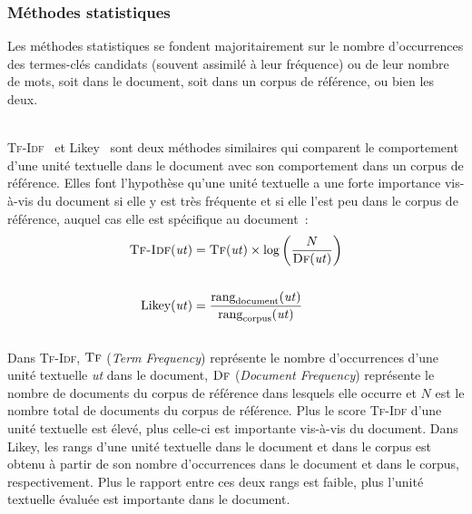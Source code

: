       \subsubsection{Méthodes statistiques}
      \label{subsubsec:main-state_of_the_art-automatic_keyphrase_extraction-unsupervised_keyphrase_extraction-statistical_approaches}
        Les méthodes statistiques se fondent majoritairement sur le nombre d'occurrences des termes-clés candidats (souvent assimilé à leur
        fréquence) ou de leur nombre de mots, soit dans le
        document, soit dans un corpus de référence, ou bien les deux.

        ~\\\textsc{Tf-Idf}~\cite{jones1972tfidf} et Likey~\cite{paukkeri2010likey}
        sont deux méthodes similaires qui comparent le comportement d'une unité
        textuelle dans le document avec son comportement dans un corpus de
        référence. Elles font l'hypothèse qu'une unité textuelle a une forte
        importance vis-à-vis du document si elle y est très fréquente et si elle
        l'est peu dans le corpus de référence, auquel cas elle est spécifique au
        document~:
        \begin{align}
          \text{\textsc{Tf-Idf}}(\text{\textit{ut}}) &= \textsc{Tf}(\text{\textit{ut}}) \times \log\left(\frac{N}{\textsc{Df}(\text{\textit{ut}})}\right) \label{math:tfidf}\\
          \notag\\
          \text{Likey}(\text{\textit{ut}}) &= \frac{\text{rang}_{\text{document}}(\text{\textit{ut}})}{\text{rang}_{\text{corpus}}(\text{\textit{ut}})} \label{math:likey}
        \end{align}\\
        Dans \textsc{Tf-Idf}, $\textsc{Tf}$ (\textit{Term Frequency}) représente
        le nombre d'occurrences d'une unité textuelle \textit{ut} dans le
        document, $\textsc{Df}$ (\textit{Document Frequency}) représente le
        nombre de documents du corpus de référence dans lesquels elle occurre
        et $N$ est le nombre total de documents du corpus de référence. Plus le
        score \textsc{Tf-Idf} d'une unité textuelle est élevé, plus celle-ci est
        importante vis-à-vis du document. Dans Likey, les rangs d'une unité
        textuelle dans le document et dans le corpus est obtenu à partir de son
        nombre d'occurrences dans le document et dans le corpus, respectivement.
        Plus le rapport entre ces deux rangs est faible, plus l'unité textuelle
        évaluée est importante dans le document.

